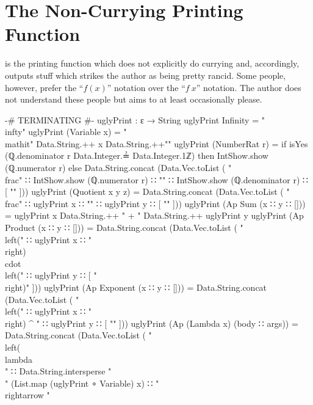 \documentclass{report}
\begin{document}
\section{The Non-Currying Printing Function}
 is the printing function which does not explicitly do currying and, accordingly, outputs stuff which strikes the author as being pretty rancid.  Some people, however, prefer the ``\(f\left(x\right)\)'' notation over the ``\(f\ x\)'' notation.  The author does not understand these people but aims to at least occasionally please.

\begin{code}
  {-# TERMINATING #-}
  uglyPrint : ε → String
  uglyPrint Infinity = "\\infty"
  uglyPrint (Variable x) = "\\mathit{" Data.String.++ x Data.String.++"}"
  uglyPrint (NumberRat r) =
    if isYes (ℚ.denominator r Data.Integer.≟ Data.Integer.1ℤ)
       then IntShow.show (ℚ.numerator r)
       else Data.String.concat (Data.Vec.toList
              ( "\\frac{"
              ∷ IntShow.show (ℚ.numerator r)
              ∷ "}{"
              ∷ IntShow.show (ℚ.denominator r)
              ∷ [ "}" ]))
  uglyPrint (Quotient x y z) =
    Data.String.concat (Data.Vec.toList
      ( "\\frac{"
      ∷ uglyPrint x
      ∷ "}{"
      ∷ uglyPrint y
      ∷ [ "}" ]))
  uglyPrint (Ap Sum (x ∷ y ∷ [])) = uglyPrint x Data.String.++ " + " Data.String.++ uglyPrint y
  uglyPrint (Ap Product (x ∷ y ∷ [])) =
    Data.String.concat (Data.Vec.toList
      ( "\\left("
      ∷ uglyPrint x
      ∷ "\\right) \\cdot \\left("
      ∷ uglyPrint y
      ∷ [ "\\right)" ]))
  uglyPrint (Ap Exponent (x ∷ y ∷ [])) =
    Data.String.concat (Data.Vec.toList
      ( "\\left("
      ∷ uglyPrint x
      ∷ "\\right) ^ {"
      ∷ uglyPrint y
      ∷ [ "}" ]))
  uglyPrint (Ap (Lambda x) (body ∷ args)) =
    Data.String.concat (Data.Vec.toList
      ( "\\left(\\lambda\\ "
      ∷ Data.String.intersperse
          "\\ "
          (List.map (uglyPrint ∘ Variable) x)
      ∷ " \\rightarrow "

\end{code}
\end{document}

